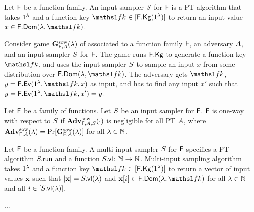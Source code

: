 Let $\FF$ be a function family.
An input sampler $S$ for $\FF$ is a PT algorithm that takes $1^\lambda$ and a function key $\FKey\in[\Kg{\FF}(\secIn)]$ to return an input value $x\in\Dom{\FF}(\secParam,\FKey)$.

Consider game $\mathbf{G}^{\rm sow}_{\mathsf{F},A}(\lambda)$ of  associated to a function family $\FF$, an adversary $\advA$, and an input sampler $S$ for $\FF$.
The game runs $\mathsf{F}.\mathsf{Kg}$ to generate a function key $\FKey$, and uses the input sampler $S$ to sample an input $x$ from some distribution over $\Dom{\FF}(\secParam,\FKey)$.
The adversary gets $\FKey$, $y=\Ev{\FF}(\secIn,\FKey,x)$ as input, and has to find any input $x'$ such that $y=\Ev{\FF}(\secIn,\FKey,x')=y$.
\begin{defn}
  Let $\FF$ be a family of functions.
  Let $S$ be an input sampler for $\FF$.
  $\FF$ is one-way with respect to $S$ if $\mathbf{Adv}^{\rm sow}_{\mathsf{F},A,S}(\cdot)$ is negligible for all PT $\advA$,
  where $\mathbf{Adv}^{\rm sow}_{\mathsf{F},A}(\lambda)=\Pr[\mathbf{G}^{\rm sow}_{\mathsf{F},A}(\lambda)]$ for all $\lambda\in{{\mathbb N}}$.
\end{defn}

Let $\FF$ be a function family.
A multi-input sampler $S$ for $\FF$ specifies a PT algorithm $S.\mathsf{run}$ and a function $S.\mathsf{vl}\colon{{\mathbb N}}\to{{\mathbb N}}$.
Multi-input sampling algorithm takes $1^\lambda$ and a function key $\FKey\in[\Kg{\FF}(\secIn)]$ to return a vector of input values ${\bf x}$ such that $|{\bf x}| = S.\mathsf{vl}(\lambda)$ and $\bx[i]\in\Dom{\FF}(\secParam,\FKey)$ for all $\lambda\in{{\mathbb N}}$ and all $i\in[S.\mathsf{vl}(\lambda)]$.

...

\iffalse
\red{
One potential problem with the above is that it does not guarantee $\Dom{\FF}(\secParam,\key)$ can be sampled from efficiently.
So the existence of a OWF will then \emph{not} imply all the things we want it to (i.e. that a PRG exists).
Note that allowing a negligible probability of error/negligible statistical distance does not fix this.
}

Now a definition based on syntax 3:

\begin{defn}
	Let $\FF$ be an input-sampleable family of functions. Then the one-way advantage of any adversary $\advA$ against $\FF$ is defined as $\owAdv{\FF,\advA}{\secParam}=\Pr[\gOW{\FF,\advA}(\secParam)]$. $\FF$ is a one-way function iff for all PT adversaries $\advA$, the function $\owAdv{\FF,\advA}{\cdot}$ is negligible.
\end{defn}

We let $\setOW$ denote the set of all one-way functions.
\fi